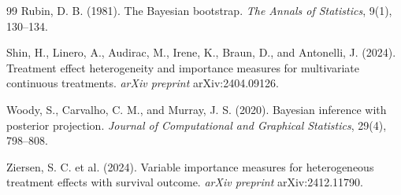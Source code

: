 \begin{thebibliography}{99}
Rubin, D. B. (1981).
The Bayesian bootstrap.
\textit{The Annals of Statistics}, 9(1), 130--134.

Shin, H., Linero, A., Audirac, M., Irene, K., Braun, D., and Antonelli, J.
(2024).
Treatment effect heterogeneity and importance measures for multivariate
continuous treatments.
\textit{arXiv preprint} arXiv:2404.09126.

Woody, S., Carvalho, C. M., and Murray, J. S. (2020).
Bayesian inference with posterior projection.
\textit{Journal of Computational and Graphical Statistics}, 29(4), 798--808.

Ziersen, S. C. et al. (2024).
Variable importance measures for heterogeneous treatment effects with survival
outcome.
\textit{arXiv preprint} arXiv:2412.11790.

\end{thebibliography}

